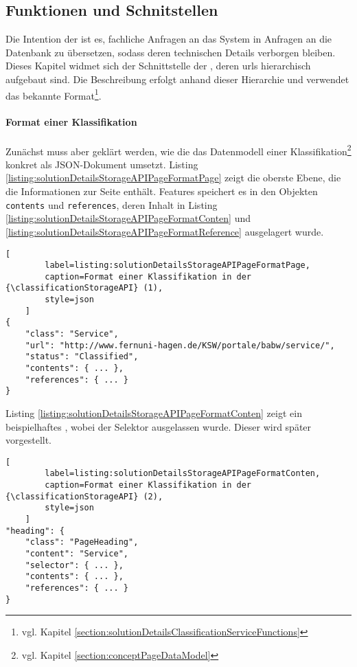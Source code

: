 \subsection{Funktionen und Schnitstellen}
    Die Intention der {\classificationStorageAPI} ist es,
    fachliche Anfragen an das System in Anfragen an die Datenbank zu übersetzen,
    sodass deren technischen Details verborgen bleiben.
    Dieses Kapitel widmet sich der Schnittstelle der {\classificationStorageAPI},
    deren \glspl{url} hierarchisch aufgebaut sind.
    Die Beschreibung erfolgt anhand dieser Hierarchie
    und verwendet das bekannte Format\footnote{vgl. Kapitel \ref{section:solutionDetailsClassificationServiceFunctions}}.

    \paragraph{Format einer Klassifikation}
    Zunächst muss aber geklärt werden, wie die {\classificationStorageAPI} das Datenmodell einer
    Klassifikation\footnote{vgl. Kapitel \ref{section:conceptPageDataModel}} konkret als JSON-Dokument umsetzt.
    Listing \ref{listing:solutionDetailsStorageAPIPageFormatPage} zeigt die oberste Ebene,
    die die Informationen zur Seite enthält.
    Features speichert es in den Objekten \texttt{contents} und \texttt{references},
    deren Inhalt in Listing \ref{listing:solutionDetailsStorageAPIPageFormatConten}
    und \ref{listing:solutionDetailsStorageAPIPageFormatReference} ausgelagert wurde.

    \begin{lstlisting}[
        label=listing:solutionDetailsStorageAPIPageFormatPage,
        caption=Format einer Klassifikation in der {\classificationStorageAPI} (1),
        style=json
    ]
{
    "class": "Service",
    "url": "http://www.fernuni-hagen.de/KSW/portale/babw/service/",
    "status": "Classified",
    "contents": { ... },
    "references": { ... }
}
    \end{lstlisting}

    Listing \ref{listing:solutionDetailsStorageAPIPageFormatConten}
    zeigt ein beispielhaftes {\contentFeature},
    wobei der Selektor ausgelassen wurde.
    Dieser wird später vorgestellt.

    \begin{lstlisting}[
        label=listing:solutionDetailsStorageAPIPageFormatConten,
        caption=Format einer Klassifikation in der {\classificationStorageAPI} (2),
        style=json
    ]
"heading": {
    "class": "PageHeading",
    "content": "Service",
    "selector": { ... },
    "contents": { ... },
    "references": { ... }
}
    \end{lstlisting}

